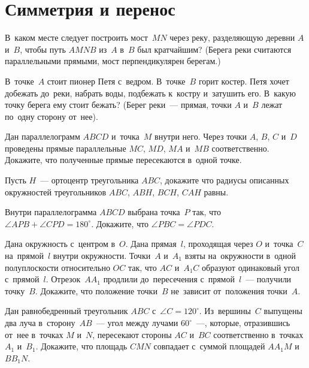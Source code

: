 
\section*{Симметрия и перенос}


\begin{problems}

\item
В~каком месте следует построить мост~$MN$ через реку, разделяющую деревни $A$
и~$B$, чтобы путь $AMNB$ из~$A$ в~$B$ был кратчайшим?
(Берега реки считаются параллельными прямыми, мост перпендикулярен берегам.)

\item
В~точке~$A$ стоит пионер Петя с~ведром.
В~точке~$B$ горит костер.
Петя хочет добежать до~реки, набрать воды, подбежать к~костру и~затушить его.
В~какую точку берега ему стоит бежать?
(Берег реки~--- прямая, точки $A$ и~$B$ лежат по~одну сторону от~нее).

\item
Дан параллелограмм $ABCD$ и~точка~$M$ внутри него.
Через точки $A$, $B$, $C$ и~$D$ проведены прямые параллельные
$MC$, $MD$, $MA$ и~$MB$ соответственно.
Докажите, что полученные прямые пересекаются в~одной точке.

\item
Пусть $H$~--- ортоцентр треугольника $ABC$, докажите что радиусы описанных
окружностей треугольников $ABC$, $ABH$, $BCH$, $CAH$ равны.


\item
Внутри параллелограмма $ABCD$ выбрана точка~$P$ так, что
$\angle APB + \angle CPD = 180^{\circ}$.
Докажите, что $\angle PBC = \angle PDC$.

\item
Дана окружность с~центром в~$O$.
Дана прямая~$l$, проходящая через $O$ и~точка~$C$ на~прямой~$l$ внутри
окружности.
Точки~$A$ и~$A_1$ взяты на~окружности в~одной полуплоскости относительно $OC$
так, что $AC$ и~$A_1 C$ образуют одинаковый угол с~прямой~$l$.
Отрезок~$A A_1$ продлили до~пересечения с~прямой~$l$~--- получили точку~$B$.
Докажите, что положение точки~$B$ не~зависит от~положения точки~$A$.

\item
Дан равнобедренный треугольник $ABC$ с~$\angle C = 120^{\circ}$.
Из~вершины~$C$ выпущены два луча в~сторону~$AB$~---
угол между лучами $60^{\circ}$~---,
которые, отразившись от~нее в~точках $M$ и~$N$, пересекают стороны $AC$ и~$BC$
соответственно в~точках $A_1$ и~$B_1$.
Докажите, что площадь $CMN$ совпадает с~суммой площадей $A A_1 M$ и~$B B_1 N$.


\end{problems}
